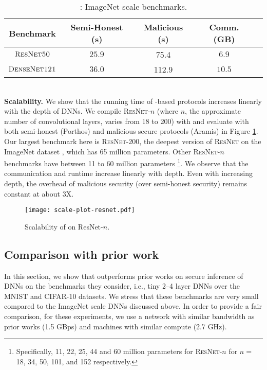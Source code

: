 \begin{table}
  \centering

      \begin{tabular}{|c|c|c|c|c|}
    \hline
    Benchmark & Semi-Honest (s) &  Malicious (s) & Comm. (GB)  \\
    \hline
    ${\textsc{ResNet50}}$ & $25.9$ & 75.4 &$6.9$\\ \hline
    ${\textsc{DenseNet121}}$ & $36.0$ & 112.9 &$10.5$\\ 	\hline

\end{tabular}
 \caption{\cryptflow: ImageNet scale benchmarks.}
\label{tab:bigbenchmarks}
\end{table}~\\
\noindent\textbf{Scalability.} We show that the running time of \tool-based protocols increases linearly with the depth of DNNs. We compile \textsc{ResNet-$n$} (where $n$, the approximate number of convolutional layers, varies from 18 to 200) with \tool and evaluate with both semi-honest (Porthos) and malicious secure protocols (Aramis) in Figure \ref{fig:scalingResnet}. Our largest benchmark here is \textsc{ResNet-$200$}, the deepest version of \textsc{ResNet} on the ImageNet dataset \cite{he2016identity}, which has 65 million parameters. Other \textsc{ResNet}-$n$ benchmarks have between 11 to 60 million parameters \footnote{Specifically, 11, 22, 25, 44 and 60 million parameters for \textsc{ResNet}-$n$ for $n=$ 18, 34, 50, 101, and 152 respectively.}. We observe that the communication and runtime increase linearly with depth. Even with increasing depth, the overhead of malicious security (over semi-honest security) remains constant at about 3X. 
\begin{figure}
  \texttt{[image: scale-plot-resnet.pdf]}
	\caption{Scalability of {\cryptflow} on {\sc ResNet}-$n$.}
  \label{fig:scalingResnet}
\end{figure}

\subsection{Comparison with prior work}
\label{sec:prior-comparison}
In this section, we show that \tool outperforms prior works on secure inference of DNNs
 on the benchmarks they consider, i.e., tiny 2--4 layer DNNs over the MNIST and CIFAR-10 datasets. We stress that these benchmarks are very small compared to the ImageNet scale DNNs discussed above. %
In order to provide a fair comparison, for these experiments, we use a network with similar bandwidth as prior works (1.5 GBps) and machines with similar compute (2.7 GHz). 

